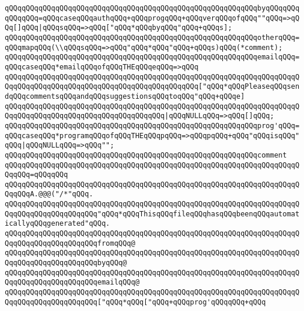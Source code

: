 \verb|qQQqqQQqqQQqqQQqqQQqqQQqqQQqqQQqqQQqqQQqqQQqqQQqqQQqqQQqqQQqbyqQQqqQQqqQQqqQQq=qQQqcaseqQQqauthqQQq+qQQqprogqQQq+qQQqverqQQqofqQQq""qQQq=>qQQq[]qQQq|\verb#|qQQqsqQQq=>qQQq["qQQq*qQQqbyqQQq"qQQq+qQQqs];#\newline
\verb|qQQqqQQqqQQqqQQqqQQqqQQqqQQqqQQqqQQqqQQqqQQqqQQqqQQqqQQqqQQqotherqQQq=qQQqmapqQQq(\\qQQqsqQQq=>qQQq"qQQq*qQQq"qQQq+qQQqs)qQQq(*comment);|\newline
\verb|qQQqqQQqqQQqqQQqqQQqqQQqqQQqqQQqqQQqqQQqqQQqqQQqqQQqqQQqqQQqemailqQQq=qQQqcaseqQQq*emailqQQqofqQQqTHEqQQqeqQQq=>qQQq|\newline
\verb|qQQqqQQqqQQqqQQqqQQqqQQqqQQqqQQqqQQqqQQqqQQqqQQqqQQqqQQqqQQqqQQqqQQqqQQqqQQqqQQqqQQqqQQqqQQqqQQqqQQqqQQqqQQqqQQqqQQq["qQQq*qQQqPleaseqQQqsendqQQqcommentsqQQqandqQQqsuggestionsqQQqtoqQQq"qQQq+qQQqe]|\newline
\verb|qQQqqQQqqQQqqQQqqQQqqQQqqQQqqQQqqQQqqQQqqQQqqQQqqQQqqQQqqQQqqQQqqQQqqQQqqQQqqQQqqQQqqQQqqQQqqQQqqQQqqQQqqQQq|\verb#|qQQqNULLqQQq=>qQQq[]qQQq;#\newline
\verb|qQQqqQQqqQQqqQQqqQQqqQQqqQQqqQQqqQQqqQQqqQQqqQQqqQQqqQQqqQQqprog'qQQq=qQQqcaseqQQq*programqQQqofqQQqTHEqQQqpqQQq=>qQQqpqQQq+qQQq"qQQqisqQQq"qQQq|\verb#|qQQqNULLqQQq=>qQQq"";#\newline
\newline
\verb|qQQqqQQqqQQqqQQqqQQqqQQqqQQqqQQqqQQqqQQqqQQqqQQqqQQqqQQqqQQqcomment|\newline
\verb|qQQqqQQqqQQqqQQqqQQqqQQqqQQqqQQqqQQqqQQqqQQqqQQqqQQqqQQqqQQqqQQqqQQqqQQqqQQq=qQQqqQQq|\newline
\verb|qQQqqQQqqQQqqQQqqQQqqQQqqQQqqQQqqQQqqQQqqQQqqQQqqQQqqQQqqQQqqQQqqQQqqQQqqQQqA.@@@("/*"qQQq.|\newline
\verb|qQQqqQQqqQQqqQQqqQQqqQQqqQQqqQQqqQQqqQQqqQQqqQQqqQQqqQQqqQQqqQQqqQQqqQQqqQQqqQQqqQQqqQQqqQQq"qQQq*qQQqThisqQQqfileqQQqhasqQQqbeenqQQqautomaticallyqQQqgenerated"qQQq.|\newline
\verb|qQQqqQQqqQQqqQQqqQQqqQQqqQQqqQQqqQQqqQQqqQQqqQQqqQQqqQQqqQQqqQQqqQQqqQQqqQQqqQQqqQQqqQQqqQQqfromqQQq@|\newline
\verb|qQQqqQQqqQQqqQQqqQQqqQQqqQQqqQQqqQQqqQQqqQQqqQQqqQQqqQQqqQQqqQQqqQQqqQQqqQQqqQQqqQQqqQQqqQQqbyqQQq@|\newline
\verb|qQQqqQQqqQQqqQQqqQQqqQQqqQQqqQQqqQQqqQQqqQQqqQQqqQQqqQQqqQQqqQQqqQQqqQQqqQQqqQQqqQQqqQQqqQQqemailqQQq@|\newline
\verb|qQQqqQQqqQQqqQQqqQQqqQQqqQQqqQQqqQQqqQQqqQQqqQQqqQQqqQQqqQQqqQQqqQQqqQQqqQQqqQQqqQQqqQQqqQQq["qQQq*qQQq["qQQq+qQQqprog'qQQqqQQq+qQQq|\newline
